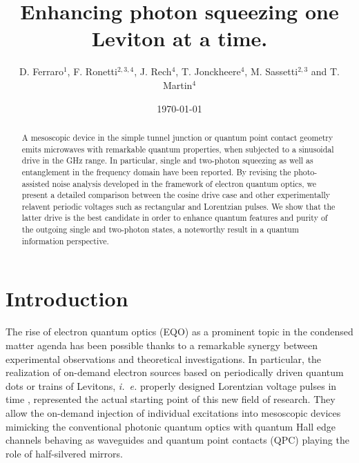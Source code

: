 \documentclass[twocolumn,showpacs,preprintnumbers,amsmath,amssymb%
 aps,
 prb,
 lengthcheck,%
]{revtex4-1}
\begin{document}
 
\title{Enhancing photon squeezing one Leviton at a time.}

\author{D. Ferraro$^{1}$, F. Ronetti$^{2, 3, 4}$, J. Rech$^{4}$, T. Jonckheere$^{4}$, M. Sassetti$^{2,3}$ and T. Martin$^{4}$ }

\date{\today}%

\begin{abstract}
A mesoscopic device in the simple tunnel junction or quantum point contact geometry emits microwaves with remarkable quantum properties, when subjected to a sinusoidal drive in the GHz range. In particular, single and two-photon squeezing as well as entanglement in the frequency domain have been reported. By revising the photo-assisted noise analysis developed in the framework of electron quantum optics, we present a detailed comparison between the cosine drive case and other experimentally relavent periodic voltages such as rectangular and Lorentzian pulses. We show that the latter drive is the best candidate in order to enhance quantum features and purity of the outgoing single and two-photon states, a noteworthy result in a quantum information perspective. 
\end{abstract}

\maketitle
\section{Introduction}
The rise of electron quantum optics (EQO) \cite{grenier_electron_2011,bocquillon_electron_2014} as a prominent topic in the condensed matter agenda has been possible thanks to a remarkable synergy between experimental observations and theoretical investigations. In particular, the realization of on-demand electron sources based on periodically driven quantum dots \cite{feve_-demand_2007} or trains of Levitons, \emph{i.~e.} properly designed Lorentzian voltage pulses in time \cite{dubois_minimal_2013, jullien_quantum_2014}, represented the actual starting point of this new field of research. They allow the on-demand injection of individual excitations into mesoscopic devices mimicking the conventional photonic quantum optics with quantum Hall edge channels behaving as waveguides and quantum point contacts (QPC) playing the role of half-silvered mirrors. 
\end{document}
